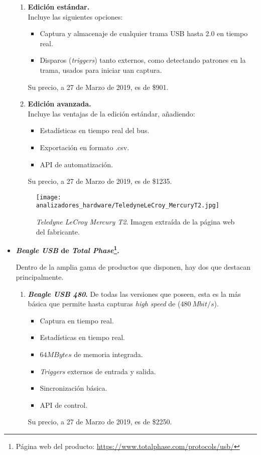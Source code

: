 \begin{itemize}
    \begin{enumerate}
        \item \textbf{Edición estándar.} \\
        Incluye las siguientes opciones:
        \begin{itemize}
            \item Captura y almacenaje de cualquier trama USB hasta 2.0 en tiempo real.
            \item Disparos (\emph{triggers}) tanto externos, como detectando patrones en la trama, usados para iniciar uan captura. 
        \end{itemize}
        Su precio, a 27 de Marzo de 2019, es de \$901.
        
        \item \textbf{Edición avanzada.} \\
        Incluye las ventajas de la edición estándar, añadiendo:
        \begin{itemize}
            \item Estadísticas en tiempo real del bus.
            \item Exportación en formato .csv.
            \item API de automatización.
        \end{itemize}
        Su precio, a 27 de Marzo de 2019, es de \$1235.
    \end{enumerate}
    \begin{figure}[htb]
        \centering
        \texttt{[image: analizadores\_hardware/TeledyneLeCroy\_MercuryT2.jpg]}
        \caption{\emph{Teledyne LeCroy Mercury T2}. Imagen extraída de la página web del fabricante.}
        \label{fig:TeledyneLeCroy-MercuryT2}
    \end{figure}

    \item \textbf{\emph{Beagle USB} de \emph{Total Phase}\footnote{Página web del producto: \url{https://www.totalphase.com/protocols/usb/}}.}
    
    Dentro de la amplia gama de productos que disponen, hay dos que destacan principalmente.
    \begin{enumerate}
        \item \textbf{\emph{Beagle USB 480}\cite{totalphase12-2018}.}
        De todas las versiones que poseen, esta es la más básica que permite hasta capturas \emph{high speed} de ($480~Mbit/s$).
        \begin{itemize}
            \item Captura en tiempo real.
            \item Estadísticas en tiempo real.
            \item $64MBytes$ de memoria integrada.
            \item \emph{Triggers} externos de entrada y salida.
            \item Sincronización básica.
            \item API de control.
        \end{itemize}
        Su precio, a 27 de Marzo de 2019, es de \$2250.
        

\end{enumerate}
\end{itemize}
